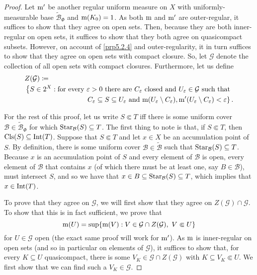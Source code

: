 \begin{thm}
\begin{savenotes}
\begin{proof}
Let $\mathrm{m} '$ be another regular uniform measure on $X$ with uniformly-measurable base $\widetilde{\mathcal{B}}_\Phi$ and $\mathrm{m} (K_0)=1$.  As both $\mathrm{m}$ and $\mathrm{m} '$ are outer-regular, it suffices to show that they agree on open sets.  Then, because they are both inner-regular on open sets, it suffices to show that they both agree on quasicompact subsets.  However, on account of \cref{prp5.2.4} and outer-regularity, it in turn suffices to show that they agree on open sets with compact closure.  So, let $\mathcal{G}$ denote the collection of all open sets with compact closures.  Furthermore, let us define
\begin{equation}
\begin{multlined}
Z(\mathcal{G})\coloneqq \\ \left\{ S\in 2^X:\text{for every }\varepsilon >0\text{ there are }C_{\varepsilon}\text{ closed and }U_{\varepsilon}\in \mathcal{G}\text{ such that }\right. \\ \left. C_\varepsilon \subseteq S\subseteq U_{\varepsilon}\text{ and }\meas (U_{\varepsilon}\setminus C_{\varepsilon}),\meas '(U_{\varepsilon}\setminus C_{\varepsilon})<\varepsilon \right\} .
\end{multlined}
\end{equation}

For the rest of this proof, let us write $S\Subset T$ iff there is some uniform cover $\mathcal{B}\in \widetilde{\mathcal{B}}_\Phi$ for which $\operatorname{Star} _{\mathcal{B}}(S)\subseteq T$.  The first thing to note is that, if $S\Subset T$, then $\operatorname{Cls} (S)\subseteq \operatorname{Int} (T)$.  Suppose that $S\Subset T$ and let $x\in X$ be an accumulation point of $S$.  By definition, there is some uniform cover $\mathcal{B}\in \widetilde{\mathcal{B}}$ such that $\operatorname{Star} _{\mathcal{B}}(S)\subseteq T$.  Because $x$ is an accumulation point of $S$ and every element of $\mathcal{B}$ is open, every element of $\mathcal{B}$ that contains $x$ (of which there must be at least one, say $B\in \mathcal{B}$), must intersect $S$, and so we have that $x\in B\subseteq \operatorname{Star} _{\mathcal{B}}(S)\subseteq T$, which implies that $x\in \operatorname{Int} (T)$.

To prove that they agree on $\mathcal{G}$, we will first show that they agree on $Z(\mathcal{G})\cap \mathcal{G}$.  To show that this is in fact sufficient, we prove that
\begin{equation}\label{5.1.75}
\meas (U)=\sup \{ \meas (V):V\in \mathcal{G}\cap Z(\mathcal{G}),\ V\Subset U\} 
\end{equation}
for $U\in \mathcal{G}$ open (the exact same proof will work for $\mathrm{m} '$).  As $\mathrm{m}$ is inner-regular on open sets (and so in particular on elements of $\mathcal{G}$), it suffices to show that, for every $K\subseteq U$ quasicompact, there is some $V_K\in \mathcal{G}\cap Z(\mathcal{G})$ with $K\subseteq V_K\Subset U$.  We first show that we can find such a $V_K\in \mathcal{G}$.


\end{proof}
\end{savenotes}
\end{thm}
